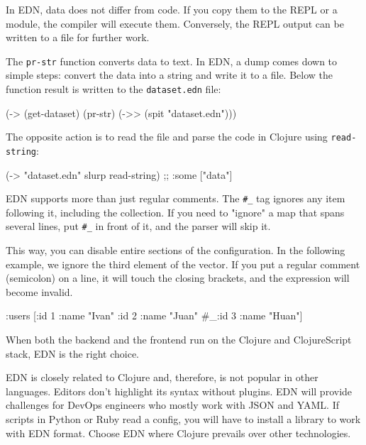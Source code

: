 \fi

In EDN, data does not differ from code. If you copy them to the REPL or a module, the compiler will execute them. Conversely, the REPL output can be written to a file for further work.

The \verb|pr-str| function converts data to text. In EDN, a dump comes down to simple steps: convert the data into a string and write it to a file. Below the function result is written to the \verb|dataset.edn| file:

\begin{english}
  \begin{clojure}
(-> (get-dataset)
    (pr-str)
    (->> (spit "dataset.edn")))
  \end{clojure}
\end{english}

The opposite action is to read the file and parse the code in Clojure using \verb|read-string|:

\begin{english}
  \begin{clojure}
(-> "dataset.edn" slurp read-string)
;; {:some ["data"]}
  \end{clojure}
\end{english}


EDN supports more than just regular comments. The \verb|#_| tag ignores any item following it, including the collection. If you need to "ignore" a map that spans several lines, put \verb|#_| in front of it, and the parser will skip it.


This way, you can disable entire sections of the configuration. In the following example, we ignore the third element of the vector. If you put a regular comment (semicolon) on a line, it will touch the closing brackets, and the expression will become invalid.

\begin{english}
  \begin{clojure}
{:users [{:id 1 :name "Ivan"}
         {:id 2 :name "Juan"}
         #_{:id 3 :name "Huan"}]}
  \end{clojure}
\end{english}

When both the backend and the frontend run on the Clojure and ClojureScript stack, EDN is the right choice.

EDN is closely related to Clojure and, therefore, is not popular in other languages. Editors don't highlight its syntax without plugins. EDN will provide challenges for DevOps engineers who mostly work with JSON and YAML. If scripts in Python or Ruby read a config, you will have to install a library to work with EDN format. Choose EDN where Clojure prevails over other technologies.

